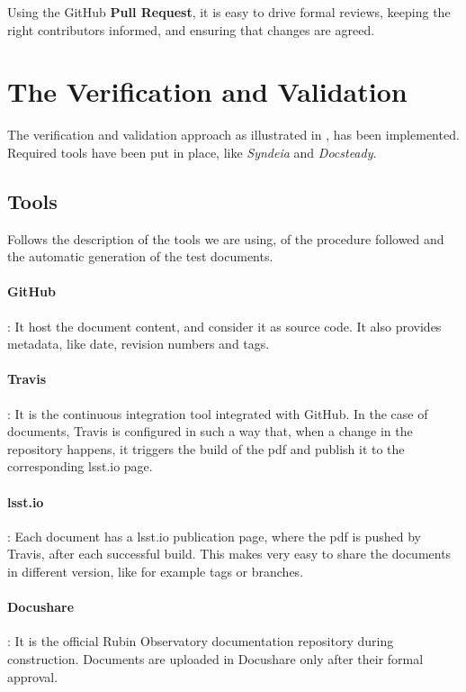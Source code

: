 Using the GitHub \textbf{Pull Request}, it is easy to drive formal reviews, keeping the right contributors informed,
and ensuring that changes are agreed.


\section{The Verification and Validation}

The verification and validation approach as illustrated in \cite{10.1117/12.2310125} , has been implemented.
Required tools have been put in place, like \textit{Syndeia} and \textit{Docsteady}.


\subsection{Tools}

Follows the description of the tools we are using, of the procedure followed and the automatic generation of the test documents.

\paragraph{GitHub}:
It host the document content, and consider it as source code. It also provides metadata, like date, revision numbers and tags.

\paragraph{Travis}:
It is the continuous integration tool integrated with GitHub.
In the case of documents, Travis is configured in such a way that, when a change in the repository happens, 
it triggers the build of the pdf and publish it to the corresponding lsst.io page.

\paragraph{lsst.io}:
Each document has a lsst.io publication page, where the pdf is pushed by Travis, after each successful build.
This makes very easy to share the documents in different version, like for example tags or branches.

\paragraph{Docushare}:
It is the official Rubin Observatory documentation repository during construction.
Documents are uploaded in Docushare only after their formal approval.

